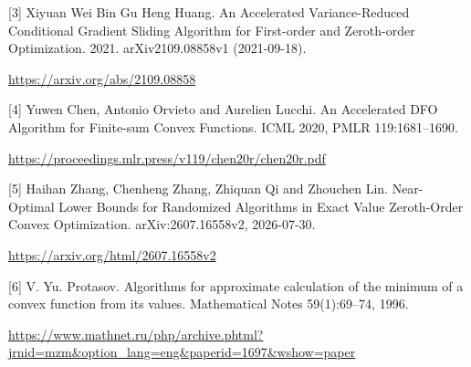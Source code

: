 \documentclass[10pt,a4paper]{article}
\begin{document}
[3] Xiyuan Wei
Bin Gu
Heng Huang. An Accelerated Variance-Reduced Conditional Gradient Sliding Algorithm for First-order and Zeroth-order Optimization. 2021. arXiv2109.08858v1 (2021-09-18).

\url{https://arxiv.org/abs/2109.08858}

[4] Yuwen Chen, Antonio Orvieto and Aurelien Lucchi. An Accelerated DFO Algorithm for Finite-sum Convex Functions. ICML 2020, PMLR 119:1681--1690.

\url{https://proceedings.mlr.press/v119/chen20r/chen20r.pdf}

[5] Haihan Zhang, Chenheng Zhang, Zhiquan Qi and Zhouchen Lin. Near-Optimal Lower Bounds for Randomized Algorithms in Exact Value Zeroth-Order Convex Optimization. arXiv:2607.16558v2, 2026-07-30.

\url{https://arxiv.org/html/2607.16558v2}

[6] V. Yu. Protasov. Algorithms for approximate calculation of the minimum of a convex function from its values. Mathematical Notes 59(1):69--74, 1996.

\url{https://www.mathnet.ru/php/archive.phtml?jrnid=mzm&option_lang=eng&paperid=1697&wshow=paper}
\end{document}
